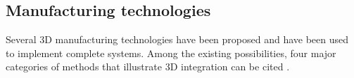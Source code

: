 


\subsection{Manufacturing technologies}

Several 3D manufacturing technologies have been proposed and have been used to implement complete systems. Among the existing possibilities, four major categories of methods that illustrate 3D integration can be cited \cite{659500,1652906}.

